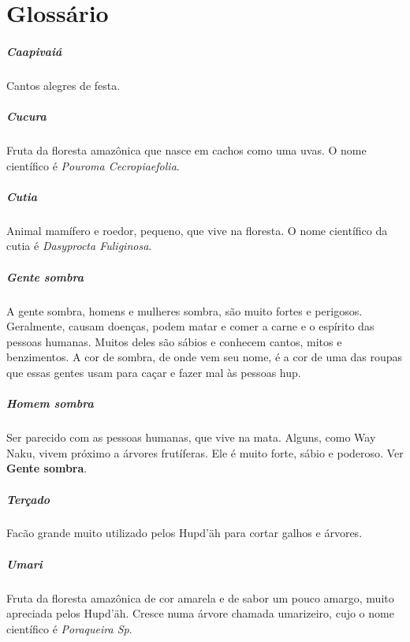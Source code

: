 \blankpage
\chapter{Glossário}


\paragraph{Caapivaiá} Cantos alegres de festa.

\paragraph{Cucura} Fruta da floresta amazônica que nasce em cachos
como uma uvas. O nome científico é \textit{Pouroma Cecropiaefolia}.

\paragraph{Cutia} Animal mamífero e roedor, pequeno, que vive na floresta. O nome
científico da cutia é \textit{Dasyprocta Fuliginosa}.

\paragraph{Gente sombra} A gente sombra, homens e mulheres sombra, são
muito fortes e perigosos. Geralmente, causam doenças, podem matar
e comer a carne e o espírito das pessoas humanas. Muitos deles
são sábios e conhecem cantos, mitos e benzimentos. A cor de
sombra, de onde vem seu nome, é a cor de uma das roupas que essas gentes
usam para caçar e fazer mal às pessoas hup.

\paragraph{Homem sombra} Ser parecido com as pessoas
humanas, que vive na mata. Alguns, como Way Naku, vivem próximo a árvores frutíferas. Ele
é muito forte, sábio e poderoso. Ver \textbf{Gente sombra}.

\paragraph{Terçado} Facão grande muito utilizado pelos Hupd’äh para cortar
galhos e árvores.

\paragraph{Umari} Fruta da floresta amazônica de cor
amarela e de sabor um pouco amargo, muito apreciada pelos Hupd’äh.
Cresce numa árvore chamada umarizeiro, cujo o nome científico é \textit{Poraqueira Sp}.


